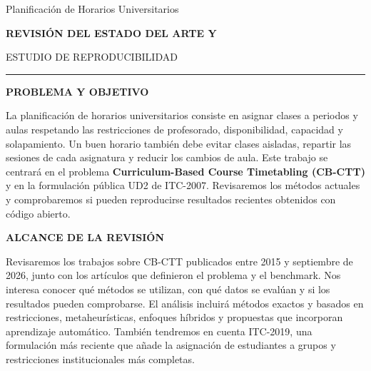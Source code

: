 \documentclass[10pt]{article}
\newcommand{\proposalheading}[1]{%
  \vspace{1.8mm}%
  {\color{wine}\sffamily\fontsize{9.8}{11.2}\selectfont\bfseries
  \MakeUppercase{#1}}\par
  \vspace{0.55mm}%
}
\begin{document}
\AddToShipoutPictureBG*{%
  \AtPageUpperLeft{\raisebox{-\height}{\color{wine}\rule{\paperwidth}{4mm}}}%
}

\begin{minipage}[t][0.98\textheight][t]{\textwidth}
\vspace{3.5mm}

\begin{center}
  {\fontsize{24}{27}\selectfont Planificación de Horarios Universitarios\par}
  \vspace{2.0mm}
  {\color{muted}\sffamily\fontsize{8.8}{10.2}\selectfont\bfseries
  REVISIÓN DEL ESTADO DEL ARTE Y\par
  ESTUDIO DE REPRODUCIBILIDAD\par}
  \vspace{2.0mm}
  {\color{wine}\rule{36mm}{0.8pt}}
\end{center}

\proposalheading{Problema y objetivo}
{\fontsize{9.4}{11.2}\selectfont\justifying
La planificación de horarios universitarios consiste en asignar clases a periodos y aulas respetando las restricciones de profesorado, disponibilidad, capacidad y solapamiento. Un buen horario también debe evitar clases aisladas, repartir las sesiones de cada asignatura y reducir los cambios de aula. Este trabajo se centrará en el problema \textbf{Curriculum-Based Course Timetabling (CB-CTT)} y en la formulación pública UD2 de ITC-2007. Revisaremos los métodos actuales y comprobaremos si pueden reproducirse resultados recientes obtenidos con código abierto.\par}

\proposalheading{Alcance de la revisión}
{\fontsize{9.2}{11}\selectfont\justifying
Revisaremos los trabajos sobre CB-CTT publicados entre 2015 y septiembre de 2026, junto con los artículos que definieron el problema y el benchmark. Nos interesa conocer qué métodos se utilizan, con qué datos se evalúan y si los resultados pueden comprobarse. El análisis incluirá métodos exactos y basados en restricciones, metaheurísticas, enfoques híbridos y propuestas que incorporan aprendizaje automático. También tendremos en cuenta ITC-2019, una formulación más reciente que añade la asignación de estudiantes a grupos y restricciones institucionales más completas.\par}


\end{minipage}
\end{document}
